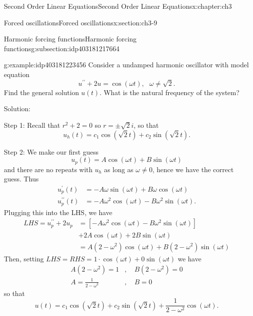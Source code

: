 \documentclass[oneside,10pt,]{book}
\numberwithin{equation}{section}
\numberwithin{equation}{section}
\newcommand{\amp}{&}
\begin{document}
\begin{chapterptx}{Second Order Linear Equations}{}{Second Order Linear Equations}{}{}{x:chapter:ch3}
\begin{sectionptx}{Forced oscillations}{}{Forced oscillations}{}{}{x:section:ch3-9}
\begin{subsectionptx}{Harmonic forcing functions}{}{Harmonic forcing functions}{}{}{g:subsection:idp403181217664}
\begin{example}{}{g:example:idp403181223456}
Consider a undamped harmonic oscillator with model equation%
\begin{equation*}
u^{\prime\prime}+2u=\cos\left(\omega t\right),\,\,\,\,\omega\neq\sqrt{2}.
\end{equation*}
Find the general solution \(u(t)\). What is the natural frequency of the system?%
\par
Solution:%
\par
Step 1: Recall that \(r^{2}+2=0\) so \(r=\pm\sqrt{2}i\), so that%
\begin{equation*}
u_{h}(t)=c_{1}\cos\left(\sqrt{2}t\right)+c_{2}\sin\left(\sqrt{2}t\right).
\end{equation*}
%
\par
Step 2: We make our first guess%
\begin{equation*}
u_{p}(t)=A\cos\left(\omega t\right)+B\sin\left(\omega t\right)
\end{equation*}
and there are no repeats with \(u_{h}\) as long as \(\omega\neq0\), hence we have the correct guess. Thus%
\begin{align*}
u_{p}^{\prime}(t) \amp =-A\omega\sin\left(\omega t\right)+B\omega\cos\left(\omega t\right)\\
u_{p}^{\prime\prime}(t) \amp =-A\omega^{2}\cos\left(\omega t\right)-B\omega^{2}\sin\left(\omega t\right).
\end{align*}
Plugging this into the LHS, we have%
\begin{align*}
LHS=u_{p}^{\prime\prime}+2u_{p} \amp =\left[-A\omega^{2}\cos\left(\omega t\right)-B\omega^{2}\sin\left(\omega t\right)\right]\\
\amp +2A\cos\left(\omega t\right)+2B\sin\left(\omega t\right)\\
\amp =A\left(2-\omega^{2}\right)\cos\left(\omega t\right)+B\left(2-\omega^{2}\right)\sin\left(\omega t\right)
\end{align*}
Then, setting \(LHS=RHS=1\cdot\cos\left(\omega t\right)+0\sin\left(\omega t\right)\) we have%
\begin{align*}
A\left(2-\omega^{2}\right)=1 \amp ,\,\,\,\,\,\,B\left(2-\omega^{2}\right)=0\\
A=\frac{1}{2-\omega^{2}} \amp ,\,\,\,\,\,\,B=0
\end{align*}
so that%
\begin{equation*}
u(t)=c_{1}\cos\left(\sqrt{2}t\right)+c_{2}\sin\left(\sqrt{2}t\right)+\frac{1}{2-\omega^{2}}\cos\left(\omega t\right).
\end{equation*}
%
\end{example}
\end{subsectionptx}

\end{sectionptx}
\end{chapterptx}
\end{document}

